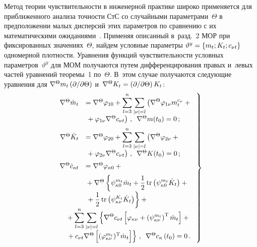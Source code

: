 \begin{multicols}{2}
Метод теории чувствительности в инженерной практике
широко применяется для приближенного анализа точности СтС со
случайными параметрами~$\Theta$ в предположении малых дисперсий этих
параметров по сравнению с их математическими ожиданиями~\cite{17-sin, 18-sin}.
Применяя описанный в~разд.~2 МОР при фиксированных значениях~$\Theta$,
найдем условные параметры $\vartheta^y \hm=\lf m_t; K_t; c_{\nu t} \rf$
одномерной плот\-ности. Уравнения функций чувствительности условных
параметров~$\vartheta^y$ для МОМ получаются путем дифференцирования правых
и~левых частей уравнений теоремы~1 по~$\Theta$. В~этом случае получаются
следующие уравнения для $\nabla^\Theta m_t \left( \partial /\partial \Theta\right)$
и~$\nabla^\Theta K_t \hm= \left( \prt / \prt \Theta\right) K_t$:
  \begin{equation}
  \left.
  \begin{array}{rl}
    \nabla^\Theta \dot m_t &=\nabla^\Theta \vrp_{10} +
    \displaystyle\sss_{l=3}^n \sss_{|\nu |=l} \left( \nabla^\Theta  
    \vrp_{1\nu} m_t^{c_\nu} +{}\right.\\[6pt]
&\left.{}+    \vrp_{1\nu} \nabla^\Theta  c_{\nu t}\right)\,, \enskip
 \nabla^\Theta  m (t_0) =0\,;
\\[6pt]
    \nabla^\Theta \dot K_t &= \nabla^\Theta  \vrp_{20} +
       \displaystyle \sss_{l=3}^n \sss_{|\nu  |=l} \left(
       \nabla^\Theta \vrp_{2\nu} +{}\right.\\[6pt]
       &\left.{}+\vrp_{2\nu}
    \nabla^\Theta  c_{\nu t}\right)\,,\enskip 
\nabla^\Theta K(t_0) =0\,;
\\[6pt]
\nabla^\Theta  \dot c_{\kappa t}& = \nabla^\Theta  \vrp_{\kappa 0} +{}\\[6pt]
&{}+\nabla^\Theta \left\{ \psi_{\kappa 0}^{m_t} \dot m_t + \fr{1}{2}\,\mathrm{tr}
\left ( \psi_{\kappa 0}^{m_t}\dot K_t\right) +{}\right.\\[6pt]
&\left.{}+\fr{1}{2}\,\mathrm{tr}
\left(\psi_{\kappa \nu}^{K_t} \dot K_t\right) \right\} + {}\\[6pt]
&    \hspace*{-10mm}\displaystyle{}+ \sss_{l=3}^n \sss_{|\nu | =l} \left\{
\nabla^\Theta  c_{\nu t} \left[ \vrp_{\kappa\nu} +
\left(\psi_{\kappa\nu}^{m_t}\right)^{\mathrm{T}} \dot m_t\right] +{}\right.\\[6pt]
&\hspace*{-10mm}\left.{}+
c_{\nu t} \nabla^\Theta  \left[ (\vrp_{\kappa \nu}^{m_t})^{\mathrm{T}} \dot m_t
\vphantom{\vrp_{\kappa\nu} +
\left(\psi_{\kappa\nu}^{m_t}\right)^{\mathrm{T}} \dot m_t}
\right]
\right\}\,,\enskip \nabla^\Theta c_\kappa \left(t_0\right)=0\,.
\end{array}
\right\}
\label{e19-sin}
\end{equation}



\end{multicols}
